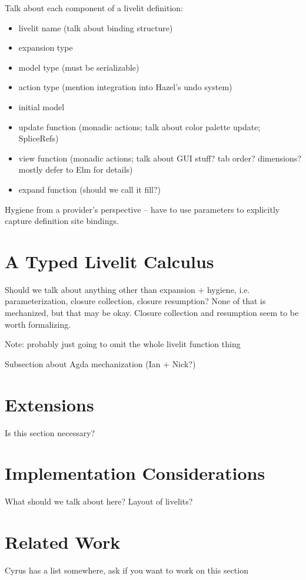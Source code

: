 Talk about each component of a livelit definition:
\begin{itemize}
  \item livelit name (talk about binding structure)
  \item expansion type
  \item model type (must be serializable)
  \item action type (mention integration into Hazel's undo system)
  \item initial model
  \item update function (monadic actions; talk about color palette update; SpliceRefs)
  \item view function (monadic actions; talk about GUI stuff? tab order? dimensions? mostly defer to Elm for details)
  \item expand function (should we call it fill?)
\end{itemize}

Hygiene from a provider's perspective -- have to use parameters to explicitly capture definition site bindings.


\section{A Typed Livelit Calculus}
Should we talk about anything other than expansion + hygiene, i.e. parameterization, closure collection, closure resumption?
None of that is mechanized, but that may be okay. Closure collection and resumption seem to be worth formalizing.

Note: probably just going to omit the whole livelit function thing

Subsection about Agda mechanization (Ian + Nick?)

\section{Extensions}
Is this section necessary?

\section{Implementation Considerations}
What should we talk about here? Layout of livelits? 

\section{Related Work}
Cyrus has a list somewhere, ask if you want to work on this section

